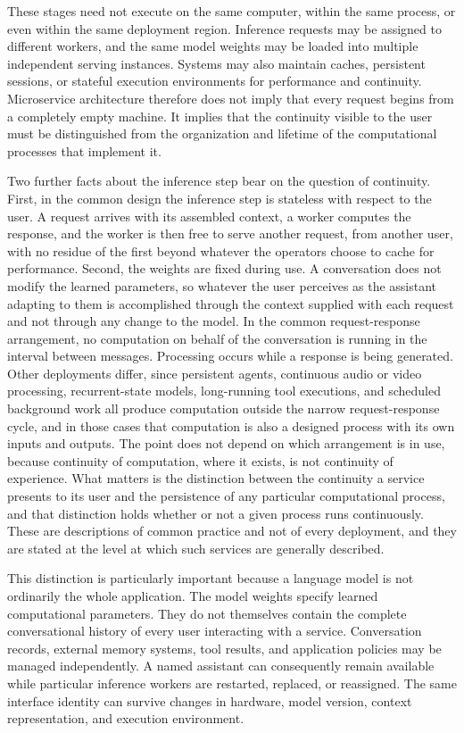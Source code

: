 \documentclass[12pt]{article}
\theoremstyle{definition}
\begin{document}
These stages need not execute on the same computer, within the same process, or even within the same deployment region. Inference requests may be assigned to different workers, and the same model weights may be loaded into multiple independent serving instances. Systems may also maintain caches, persistent sessions, or stateful execution environments for performance and continuity. Microservice architecture therefore does not imply that every request begins from a completely empty machine. It implies that the continuity visible to the user must be distinguished from the organization and lifetime of the computational processes that implement it.

Two further facts about the inference step bear on the question of continuity. First, in the common design the inference step is stateless with respect to the user. A request arrives with its assembled context, a worker computes the response, and the worker is then free to serve another request, from another user, with no residue of the first beyond whatever the operators choose to cache for performance. Second, the weights are fixed during use. A conversation does not modify the learned parameters, so whatever the user perceives as the assistant adapting to them is accomplished through the context supplied with each request and not through any change to the model. In the common request-response arrangement, no computation on behalf of the conversation is running in the interval between messages. Processing occurs while a response is being generated. Other deployments differ, since persistent agents, continuous audio or video processing, recurrent-state models, long-running tool executions, and scheduled background work all produce computation outside the narrow request-response cycle, and in those cases that computation is also a designed process with its own inputs and outputs. The point does not depend on which arrangement is in use, because continuity of computation, where it exists, is not continuity of experience. What matters is the distinction between the continuity a service presents to its user and the persistence of any particular computational process, and that distinction holds whether or not a given process runs continuously. These are descriptions of common practice and not of every deployment, and they are stated at the level at which such services are generally described.

This distinction is particularly important because a language model is not ordinarily the whole application. The model weights specify learned computational parameters. They do not themselves contain the complete conversational history of every user interacting with a service. Conversation records, external memory systems, tool results, and application policies may be managed independently. A named assistant can consequently remain available while particular inference workers are restarted, replaced, or reassigned. The same interface identity can survive changes in hardware, model version, context representation, and execution environment.
\end{document}
